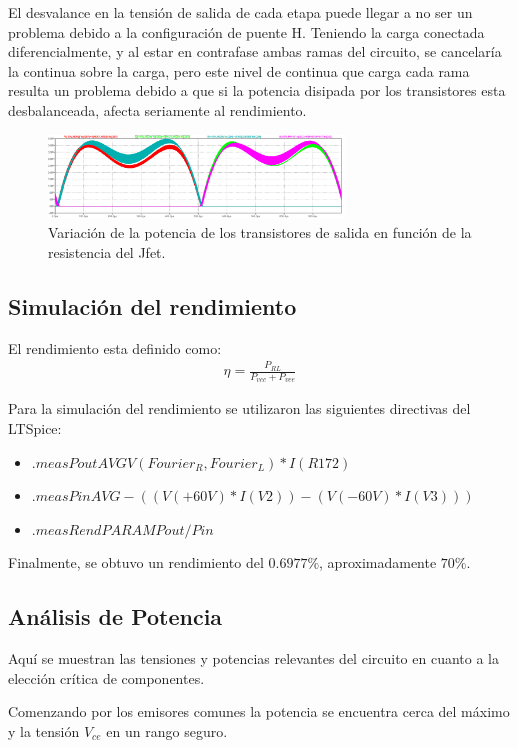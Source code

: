 El desvalance en la tensión de salida de cada etapa puede llegar a no ser un problema debido a la configuración de puente H. Teniendo la carga conectada diferencialmente, y al estar en contrafase ambas ramas del circuito, se cancelaría la continua sobre la carga, pero este nivel de continua que carga cada rama resulta un problema debido a que si la potencia disipada por los transistores esta desbalanceada, afecta seriamente al rendimiento.
 \begin{figure}[H]
\centering
	\includegraphics[width=0.7\textwidth]{ImagenesSimulaciones/DesvalanceP.png}
	\caption{Variación de la potencia de los transistores de salida en función de la resistencia del Jfet.}
	\label{fig:mcPl}
\end{figure} 

\subsection{Simulación del rendimiento}
El rendimiento esta definido como:
\begin{align}
\eta = \frac{P_{RL}}{P_{vcc}+P_{vee}}
\end{align}

Para la simulación del rendimiento se utilizaron las siguientes directivas del LTSpice:

\begin{itemize}
\item $.meas Pout AVG V(Fourier_R,Fourier_L)*I(R172)$
\item $.meas Pin AVG -((V(+60V)*I(V2))-(V(-60V)*I(V3)))$
\item $.meas Rend PARAM Pout/Pin$
\end{itemize}

Finalmente, se obtuvo un rendimiento del $0.6977\%$, aproximadamente $70\%$.

\subsection{Análisis de Potencia}
Aquí se muestran las tensiones y potencias relevantes del circuito en cuanto a la elección crítica de componentes.

Comenzando por los emisores comunes la potencia se encuentra cerca del máximo y la tensión $V_{ce}$ en un rango seguro.

